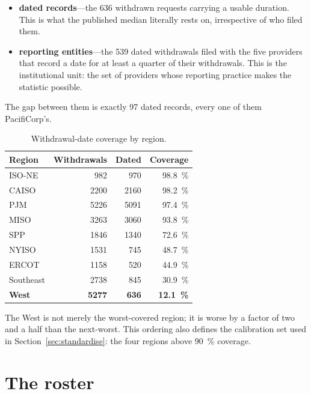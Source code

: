 \documentclass[11pt,a4paper]{article}
\begin{document}
\begin{itemize}
\item \textbf{dated records}---the 636 withdrawn requests carrying a usable
duration. This is what the published median literally rests on, irrespective of
who filed them.
\item \textbf{reporting entities}---the 539 dated withdrawals filed with the five
providers that record a date for at least a quarter of their withdrawals. This is
the institutional unit: the set of providers whose reporting practice makes the
statistic possible.
\end{itemize}

The gap between them is exactly 97 dated records, every one of them PacifiCorp's.

\begin{table}[htbp]
\centering
\caption{Withdrawal-date coverage by region.}
\begin{tabular}{lrrr}
\toprule
Region & Withdrawals & Dated & Coverage \\
\midrule
ISO-NE      & \num{982}  & \num{970}  & \SI{98.8}{\percent} \\
CAISO       & \num{2200} & \num{2160} & \SI{98.2}{\percent} \\
PJM         & \num{5226} & \num{5091} & \SI{97.4}{\percent} \\
MISO        & \num{3263} & \num{3060} & \SI{93.8}{\percent} \\
SPP         & \num{1846} & \num{1340} & \SI{72.6}{\percent} \\
NYISO       & \num{1531} & \num{745}  & \SI{48.7}{\percent} \\
ERCOT       & \num{1158} & \num{520}  & \SI{44.9}{\percent} \\
Southeast   & \num{2738} & \num{845}  & \SI{30.9}{\percent} \\
\textbf{West} & \textbf{\num{5277}} & \textbf{636} & \textbf{\SI{12.1}{\percent}} \\
\bottomrule
\end{tabular}
\end{table}

The West is not merely the worst-covered region; it is worse by a factor of two
and a half than the next-worst. This ordering also defines the calibration set
used in Section~\ref{sec:standardise}: the four regions above
\SI{90}{\percent} coverage.

\section{The roster}
\end{document}
